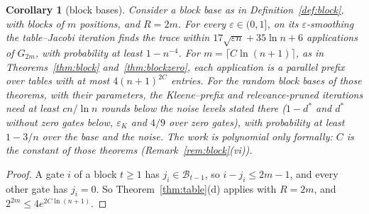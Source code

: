 \documentclass[11pt]{amsart}
\newtheorem{corollary}[theorem]{Corollary}
\theoremstyle{definition}
\theoremstyle{remark}
\newcommand{\eps}{\varepsilon}
\begin{document}
\begin{corollary}[block bases]\label{cor:tableblock}
Consider a block base as in Definition~\ref{def:block}, with blocks of $m$ positions, and
$R=2m$. For every $\eps\in(0,1]$, on its $\eps$-smoothing the table--Jacobi iteration finds the
trace within $17\sqrt{\eps n}+35\ln n+6$ applications of $G_{2m}$, with probability at least
$1-n^{-4}$. For $m=\lceil C\ln(n+1)\rceil$, as in Theorems~\ref{thm:block}
and~\ref{thm:blockzero}, each application is a parallel prefix over tables with at most
$4(n+1)^{2C}$ entries. For the random block bases of those theorems, with their parameters, the
Kleene--prefix and relevance-pruned iterations need at least $cn/\ln n$ rounds below the noise
levels stated there ($1-d^*$ and $d^*$ without zero gates below, $\eps_K$ and $4/9$ over zero
gates), with probability at least $1-3/n$ over the base and the noise. The work is polynomial
only formally: $C$ is the constant of those theorems (Remark~\ref{rem:block}(vi)).
\end{corollary}

\begin{proof}
A gate $i$ of a block $t\ge1$ has $j_i\in\mathcal B_{t-1}$, so $i-j_i\le2m-1$, and every other gate
has $j_i=0$. So Theorem~\ref{thm:table}(d) applies with $R=2m$, and $2^{2m}\le4e^{2C\ln(n+1)}$.
\end{proof}
\end{document}
